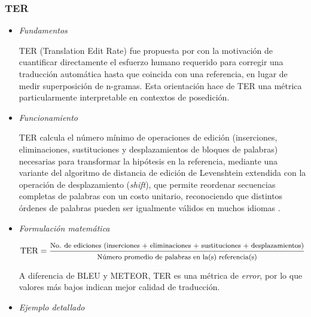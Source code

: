 \subsubsection{TER}
\vspace{-0.1cm}
\begin{itemize}
\item \textit{Fundamentos} \\
\vspace{-0.5cm}

TER (Translation Edit Rate) fue propuesta por \citet{snover2006ter} con la motivación de cuantificar directamente el esfuerzo humano requerido para corregir una traducción automática hasta que coincida con una referencia, en lugar de medir superposición de n-gramas. Esta orientación hace de TER una métrica particularmente interpretable en contextos de posedición.

\item \textit{Funcionamiento} \\
\vspace{-0.5cm}

TER calcula el número mínimo de operaciones de edición (inserciones, eliminaciones, sustituciones y desplazamientos de bloques de palabras) necesarias para transformar la hipótesis en la referencia, mediante una variante del algoritmo de distancia de edición de Levenshtein extendida con la operación de desplazamiento (\textit{shift}), que permite reordenar secuencias completas de palabras con un costo unitario, reconociendo que distintos órdenes de palabras pueden ser igualmente válidos en muchos idiomas \cite{snover2006ter}.

\item \textit{Formulación matemática} \\
\vspace{-0.5cm}

\begin{equation}
\text{TER} = \frac{\text{\footnotesize No. de ediciones (inserciones + eliminaciones + sustituciones + desplazamientos)}}{\text{\footnotesize Número promedio de palabras en la(s) referencia(s)}}
\end{equation}

 A diferencia de BLEU y METEOR, TER es una métrica de \textit{error}, por lo que valores más bajos indican mejor calidad de traducción.

\item \textit{Ejemplo detallado} \\
\vspace{-0.5cm}


\end{itemize}
